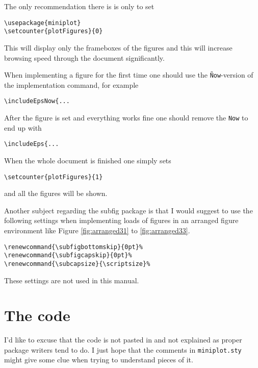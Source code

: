 \documentclass[12pt,a4paper]{article}
\newcommand{\comm}[1]{\texttt{#1}}
\begin{document}
The only recommendation there is is only to set

\begin{verbatim}
\usepackage{miniplot}
\setcounter{plotFigures}{0}
\end{verbatim}

This will display only the frameboxes of the figures and this will
increase browsing speed through the document significantly.

When implementing a figure for the first time one should use the
\comm{\~Now}-version of the implementation command, for example

\begin{verbatim}
\includeEpsNow{...
\end{verbatim}

After the figure is set and everything works fine one should remove the 
\comm{Now} to end up with

\begin{verbatim}
\includeEps{...
\end{verbatim}

When the whole document is finished one simply sets

\begin{verbatim}
\setcounter{plotFigures}{1}
\end{verbatim}

and all the figures will be shown.

Another subject regarding the subfig package is that I would suggest to use
the following settings when implementing loads of figures in an arranged figure
environment like Figure \ref{fig:arranged31} to \ref{fig:arranged33}.

\begin{verbatim}
\renewcommand{\subfigbottomskip}{0pt}%
\renewcommand{\subfigcapskip}{0pt}%
\renewcommand{\subcapsize}{\scriptsize}%
\end{verbatim}

These settings are not used in this manual.







\section{The code}

I'd like to excuse that the code is not pasted in and not explained as 
proper package writers tend to do. I just hope that the comments in 
\comm{miniplot.sty} might give some clue when trying to understand 
pieces of it.
\end{document}
